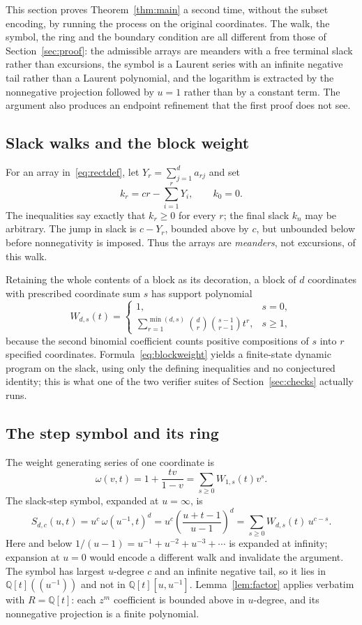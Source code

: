 \documentclass[11pt]{article}
\numberwithin{equation}{section}
\theoremstyle{definition}
\newcommand{\Q}{\mathbb Q}
\begin{document}
This section proves Theorem~\ref{thm:main} a second time, without the subset
encoding, by running the process on the original coordinates. The walk, the
symbol, the ring and the boundary condition are all different from those of
Section~\ref{sec:proof}: the admissible arrays are meanders with a free
terminal slack rather than excursions, the symbol is a Laurent series with an
infinite negative tail rather than a Laurent polynomial, and the logarithm is
extracted by the nonnegative projection followed by $u=1$ rather than by a
constant term. The argument also produces an endpoint refinement that the
first proof does not see.

\subsection{Slack walks and the block weight}
For an array in~\eqref{eq:rectdef}, let $Y_r=\sum_{j=1}^d a_{rj}$ and set
\[
 k_r=cr-\sum_{i=1}^rY_i,\qquad k_0=0.
\]
The inequalities say exactly that $k_r\geq0$ for every $r$; the final slack
$k_n$ may be arbitrary. The jump in slack is $c-Y_r$, bounded above by $c$,
but unbounded below before nonnegativity is imposed. Thus the arrays are
\emph{meanders}, not excursions, of this walk.

Retaining the whole contents of a block as its decoration, a block of $d$
coordinates with prescribed coordinate sum $s$ has support polynomial
\begin{equation}
 W_{d,s}(t)=
 \begin{cases}
  1,&s=0,\\
  \displaystyle\sum_{r=1}^{\min(d,s)}
       \binom{d}{r}\binom{s-1}{r-1}t^r,&s\geq1,
 \end{cases}
 \label{eq:blockweight}
\end{equation}
because the second binomial coefficient counts positive compositions of $s$
into $r$ specified coordinates. Formula~\eqref{eq:blockweight} yields a
finite-state dynamic program on the slack, using only the defining
inequalities and no conjectured identity; this is what one of the two
verifier suites of Section~\ref{sec:checks} actually runs.

\subsection{The step symbol and its ring}
The weight generating series of one coordinate is
\[
 \omega(v,t)=1+\frac{tv}{1-v}=\sum_{s\geq0}W_{1,s}(t)v^s .
\]
The slack-step symbol, expanded at $u=\infty$, is
\begin{equation}
 S_{d,c}(u,t)=u^c\,\omega(u^{-1},t)^d
             =u^c\left(\frac{u+t-1}{u-1}\right)^d
             =\sum_{s\geq0}W_{d,s}(t)\,u^{c-s}.
 \label{eq:slacksymbol}
\end{equation}
Here and below $1/(u-1)=u^{-1}+u^{-2}+u^{-3}+\cdots$ is expanded at infinity;
expansion at $u=0$ would encode a different walk and invalidate the argument.
The symbol has largest $u$-degree $c$ and an infinite negative tail, so it
lies in $\Q[t]((u^{-1}))$ and not in $\Q[t][u,u^{-1}]$. Lemma~\ref{lem:factor}
applies verbatim with $R=\Q[t]$: each $z^m$ coefficient is bounded above in
$u$-degree, and its nonnegative projection is a finite polynomial.
\end{document}
